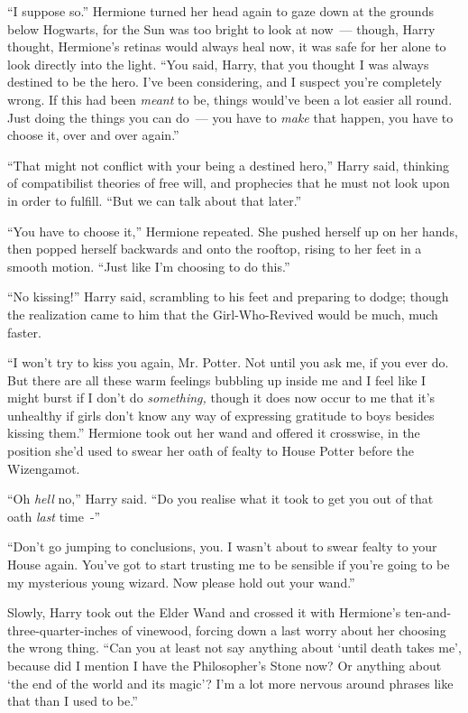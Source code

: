 ``I suppose so.'' Hermione turned her head again to gaze down at the grounds below Hogwarts, for the Sun was too bright to look at now~--- though, Harry thought, Hermione's retinas would always heal now, it was safe for her alone to look directly into the light. ``You said, Harry, that you thought I was always destined to be the hero. I've been considering, and I suspect you're completely wrong. If this had been \emph{meant} to be, things would've been a lot easier all round. Just doing the things you can do~--- you have to \emph{make} that happen, you have to choose it, over and over again.''

``That might not conflict with your being a destined hero,'' Harry said, thinking of compatibilist theories of free will, and prophecies that he must not look upon in order to fulfill. ``But we can talk about that later.''

``You have to choose it,'' Hermione repeated. She pushed herself up on her hands, then popped herself backwards and onto the rooftop, rising to her feet in a smooth motion. ``Just like I'm choosing to do this.''

``No kissing!'' Harry said, scrambling to his feet and preparing to dodge; though the realization came to him that the Girl-Who-Revived would be much, much faster.

``I won't try to kiss you again, Mr. Potter. Not until you ask me, if you ever do. But there are all these warm feelings bubbling up inside me and I feel like I might burst if I don't do \emph{something,} though it does now occur to me that it's unhealthy if girls don't know any way of expressing gratitude to boys besides kissing them.'' Hermione took out her wand and offered it crosswise, in the position she'd used to swear her oath of fealty to House Potter before the Wizengamot.

``Oh \emph{hell} no,'' Harry said. ``Do you realise what it took to get you out of that oath \emph{last} time~-''

``Don't go jumping to conclusions, you. I wasn't about to swear fealty to your House again. You've got to start trusting me to be sensible if you're going to be my mysterious young wizard. Now please hold out your wand.''

Slowly, Harry took out the Elder Wand and crossed it with Hermione's ten-and-three-quarter-inches of vinewood, forcing down a last worry about her choosing the wrong thing. ``Can you at least not say anything about `until death takes me', because did I mention I have the Philosopher's Stone now? Or anything about `the end of the world and its magic'? I'm a lot more nervous around phrases like that than I used to be.''

